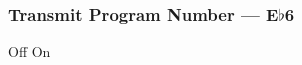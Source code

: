\subsubsection{Transmit Program Number --- \UiKey{\SET}E$\flat$6}









































Off
On

